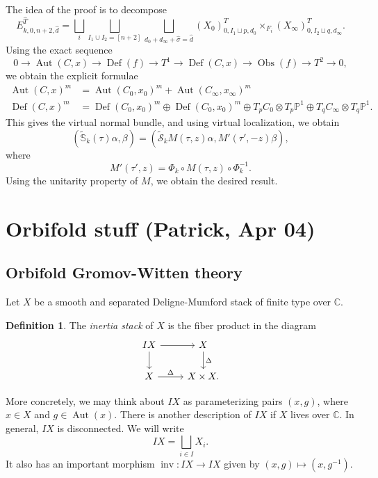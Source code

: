 \documentclass[leqno, openany]{memoir}
\theoremstyle{definition}
\newtheorem{defn}[thm]{Definition}
\theoremstyle{remark}
\theoremstyle{plain}
\theoremstyle{definition}
\theoremstyle{remark}
\newcommand{\C}{\mathbb{C}}
\newcommand{\bS}{\mathbb{S}}
\renewcommand{\P}{\mathbb{P}}
\newcommand{\mc}[1]{\mathcal{#1}}
\newcommand{\on}[1]{\operatorname{#1}}
\newcommand{\wt}[1]{\widetilde{#1}}
\newcommand{\wh}[1]{\widehat{#1}}
\DeclareMathOperator{\Aut}{Aut}
\begin{document}
The idea of the proof is to decompose
\[ E_{k,0,n+2,\wh{d}}^{\wh{T}} = \bigsqcup_i \bigsqcup_{I_1 \cup I_2 = [n+2]} \bigsqcup_{d_0 + d_{\infty} + \wh{\sigma} = \wh{{d}}} (X_0)_{0,I_1 \sqcup p, d_0}^T \times_{F_i} (X_{\infty})_{0,I_2 \sqcup q, d_{\infty}}^T. \]
Using the exact sequence
\[ 0 \to \Aut(C,x) \to \on{Def}(f) \to T^1 \to \on{Def}(C,x) \to \on{Obs}(f) \to T^2 \to 0, \]
we obtain the explicit formulae
\begin{align*}
    \Aut(C,x)^m &= \Aut(C_0,x_0)^m + \Aut(C_{\infty}, x_{\infty})^m \\
    \on{Def}(C,x)^m &= \on{Def}(C_0, x_0)^m \oplus \on{Def}(C_0, x_0)^m \oplus T_p C_0 \otimes T_p \P^1 \oplus T_q C_{\infty} \otimes T_q \P^1.
\end{align*}
This gives the virtual normal bundle, and using virtual localization, we obtain
\[ (\wt{\bS}_k(\tau) \alpha, \beta) = (\wt{\mc{S}}_k M(\tau, z) \alpha, M'(\tau', -z) \beta), \]
where
\[ M'(\tau', z) = \Phi_k \circ M(\tau, z) \circ \Phi_k^{-1}. \]
Using the unitarity property of $M$, we obtain the desired result.

\section{Orbifold stuff (Patrick, Apr 04)}%
\label{sec:Orbifold stuff Patrick Apr 04}


\subsection{Orbifold Gromov-Witten theory}%
\label{sub:Orbifold Gromov-Witten theory}

Let $X$ be a smooth and separated Deligne-Mumford stack of finite type over $\C$. 

\begin{defn}
    The \textit{inertia stack} of $X$ is the fiber product in the diagram
    \begin{equation*}
    \begin{tikzcd}
        IX \ar{r} \ar{d} & X \ar{d}{\Delta} \\
        X \ar{r}{\Delta} & X \times X.
    \end{tikzcd}
    \end{equation*}
\end{defn}
More concretely, we may think about $IX$ as parameterizing pairs $(x,g)$, where $x\in X$ and $g \in \Aut(x)$. There is another description of $IX$ if $X$ lives over $\C$. In general, $IX$ is disconnected. We will write
\[ IX = \bigsqcup_{i \in I} X_i. \]
It also has an important morphism $\on{inv} \colon IX \to IX$ given by $(x,g) \mapsto (x,g^{-1})$.
\end{document}
